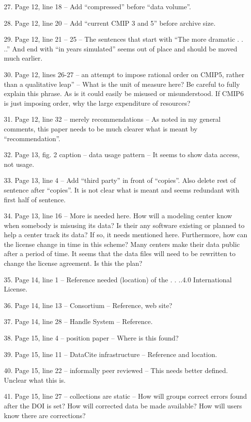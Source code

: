 \documentclass[gmd,manuscript]{copernicus}
\begin{document}
27. Page 12, line 18 – Add “compressed” before “data volume”.

28. Page 12, line 20 – Add “current CMIP 3 and 5” before archive size.

29. Page 12, line 21 – 25 – The sentences that start with “The more
dramatic . . ..” And end with “in years simulated” seems out of place
and should be moved much earlier.

30. Page 12, lines 26-27 – an attempt to impose rational order on
CMIP5, rather than a qualitative leap” – What is the unit of measure
here? Be careful to fully explain this phrase. As is it could easily
be misused or misunderstood. If CMIP6 is just imposing order, why the
large expenditure of resources?

31. Page 12, line 32 – merely recommendations – As noted in my general
comments, this paper needs to be much clearer what is meant by
“recommendation”.

32. Page 13, fig. 2 caption – data usage pattern – It seems to show
data access, not usage.

33. Page 13, line 4 – Add “third party” in front of “copies”. Also
delete rest of sentence after “copies”. It is not clear what is meant
and seems redundant with first half of sentence.

34. Page 13, line 16 – More is needed here. How will a modeling center
know when somebody is misusing its data? Is their any software
existing or planned to help a center track its data? If so, it needs
mentioned here. Furthermore, how can the license change in time in
this scheme? Many centers make their data public after a period of
time. It seems that the data files will need to be rewritten to change
the license agreement. Is this the plan?

35. Page 14, line 1 – Reference needed (location) of the . . ..4.0
International License.

36. Page 14, line 13 – Consortium – Reference, web site?

37. Page 14, line 28 – Handle System – Reference.

38. Page 15, line 4 – position paper – Where is this found?

39. Page 15, line 11 – DataCite infrastructure – Reference and
location.

40. Page 15, line 22 – informally peer reviewed – This needs better
defined. Unclear what this is.

41. Page 15, line 27 – collections are static – How will groups
correct errors found after the DOI is set? How will corrected data be
made available? How will users know there are corrections?
\end{document}
